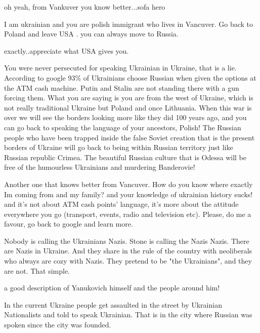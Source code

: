 \begin{itemize}
\begin{itemize} %
oh yeah, from Vankuver you know better...sofa hero

I am ukrainian and you are polish immigrant who lives in Vancuver. Go back to Poland and leave USA . you can always move to Russia.

exactly..appreciate what USA gives you.


You were never persecuted for speaking Ukrainian in Ukraine, that is a lie.
According to google 93\% of Ukrainians choose Russian when given the options at
the ATM cash machine. Putin and Stalin are not standing there with a gun
forcing them. What you are saying is you are from the west of Ukraine, which is
not really traditional Ukraine but Poland and once Lithuania. When this war is
over we will see the borders looking more like they did 100 years ago, and you
can go back to speaking the language of your ancestors, Polish! The Russian
people who have been trapped inside the false Soviet creation that is the
present borders of Ukraine will go back to being within Russian territory just
like Russian republic Crimea. The beautiful Russian culture that is Odessa will
be free of the humourless Ukrainians and murdering Banderovie!


Another one that knows better from Vancuver. How do you know where exactly Im
coming from and my family? and your knowledge of ukrainian history sucks! and
it's not about ATM cash points' language, it's more about the attitude
everywhere you go (transport, events, radio and television etc). Please, do me
a favour, go back to google and learn more.


Nobody is calling the Ukrainians Nazis. Stone is calling the Nazis Nazis. There
are Nazis in Ukraine. And they share in the rule of the country with
neoliberals who always are cozy with Nazis. They pretend to be "the
Ukrainians", and they are not. That simple.


a good description of Yanukovich himself and the people around him!


In the current Ukraine people get assaulted in the street by Ukrainian
Nationalists and told to speak Ukrainian. That is in the city where Russian was
spoken since the city was founded.


\end{itemize}
\end{itemize}
